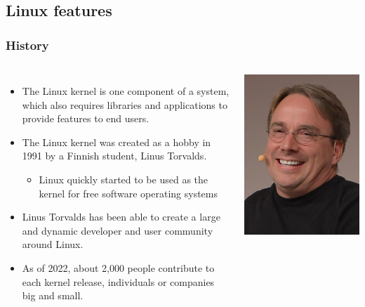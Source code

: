 \subsection{Linux features}

\begin{frame}
  \frametitle{History}
  \begin{columns}
    \begin{itemize}
    \item The Linux kernel is one component of a system, which also
      requires libraries and applications to provide features to end
      users.
    \item The Linux kernel was created as a hobby in 1991 by a Finnish
      student, Linus Torvalds.
      \begin{itemize}
      \item Linux quickly started to be used as the kernel for free
        software operating systems
      \end{itemize}
    \item Linus Torvalds has been able to create a large and dynamic
      developer and user community around Linux.
    \item As of 2022, about 2,000 people contribute to each kernel
      release, individuals or companies big and small.
    \end{itemize}
      \includegraphics[width=\textwidth]{slides/sysdev-linux-intro-features/linus-torvalds.jpg}

\end{columns}
\end{frame}
